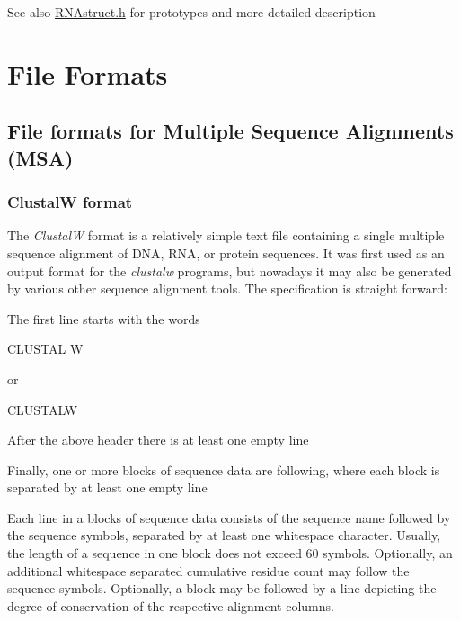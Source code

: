 \begin{DoxySeeAlso}{See also}
\hyperlink{RNAstruct_8h}{R\+N\+Astruct.\+h} for prototypes and more detailed description 
\end{DoxySeeAlso}
\hypertarget{file_formats}{}\section{File Formats}\label{file_formats}
\hypertarget{file_formats_msa-formats}{}\subsection{File formats for Multiple Sequence Alignments (\+M\+S\+A)}\label{file_formats_msa-formats}
\hypertarget{file_formats_msa-formats-clustal}{}\subsubsection{Clustal\+W format}\label{file_formats_msa-formats-clustal}
The {\itshape ClustalW} format is a relatively simple text file containing a single multiple sequence alignment of D\+NA, R\+NA, or protein sequences. It was first used as an output format for the {\itshape clustalw} programs, but nowadays it may also be generated by various other sequence alignment tools. The specification is straight forward\+:


\begin{DoxyItemize}
\item The first line starts with the words\begin{DoxyVerb}CLUSTAL W \end{DoxyVerb}
 or \begin{DoxyVerb}CLUSTALW \end{DoxyVerb}

\item After the above header there is at least one empty line
\item Finally, one or more blocks of sequence data are following, where each block is separated by at least one empty line
\end{DoxyItemize}Each line in a blocks of sequence data consists of the sequence name followed by the sequence symbols, separated by at least one whitespace character. Usually, the length of a sequence in one block does not exceed 60 symbols. Optionally, an additional whitespace separated cumulative residue count may follow the sequence symbols. Optionally, a block may be followed by a line depicting the degree of conservation of the respective alignment columns.

